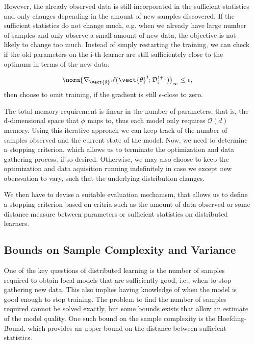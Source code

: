 However, the already observed data is still incorporated in the sufficient statistics and only changes depending in the amount of new samples discovered.
If the sufficient statistics do not change much, e.g. when we already have large number of samples and only observe a small amount of new data, the objective is not likely to change too much. 
Instead of simply restarting the training, we can check if the old parameters on the i-th learner are still sufficientely close to the optimum in terms of the new data: 

\begin{equation}
    \norm{\nabla_{\vect{\theta}^t} \ell(\vect{\theta}^{t} ; \mathcal{D}_i^{t+1})}_{\infty} \leq \epsilon,
\end{equation}
then choose to omit training, if the gradient is still $\epsilon$-close to zero.

The total memory requirement is linear  in the number of parameters, that is, the d-dimensional space that $\phi$ maps to, thus each model only requires $\mathcal{O}(d)$ memory.
Using this iterative approach we can keep track of the number of samples observed and the current state of the model.
Now, we need to determine a stopping criterion, which allows us to terminate the optimization and data gathering process, if so desired. 
Otherwise, we may also choose to keep the optimization and data aquisition running indefinitely in case we except new obersvation to vary, such that the underlying distribution changes.

We then have to devise a suitable evaluation mechanism, that allows us to define a stopping criterion based on critria such as the amount of data observed or some distance measure between parameters or sufficient statistics on distributed learners.

\subsection{Bounds on Sample Complexity and Variance}
\label{ssec:bounds}
One of the key questions of distributed learning is the number of samples required to obtain local models that are sufficiently good, i.e., when to stop gathering new data.
This also implies having knowledge of when the model is good enough to stop training.
The problem to find the number of samples required cannot be solved exactly, but some bounds exists that allow an estimate of the model quality.
One such bound on the sample complexity is the Hoefding-Bound, which provides an upper bound on the distance between sufficient statistics.
 
